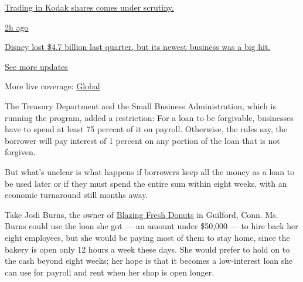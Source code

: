 \href{https://www.nytimes3xbfgragh.onion/live/2020/08/04/business/stock-market-today-coronavirus?action=click\&pgtype=Article\&state=default\&region=MAIN_CONTENT_1\&context=storylines_live_updates\#trading-in-kodak-shares-comes-under-scrutiny}{Trading
in Kodak shares comes under scrutiny.}

\href{https://www.nytimes3xbfgragh.onion/live/2020/08/04/business/stock-market-today-coronavirus?action=click\&pgtype=Article\&state=default\&region=MAIN_CONTENT_1\&context=storylines_live_updates\#disney-lost-4-7-billion-last-quarter-but-its-newest-business-was-a-big-hit}{2h
ago}

\href{https://www.nytimes3xbfgragh.onion/live/2020/08/04/business/stock-market-today-coronavirus?action=click\&pgtype=Article\&state=default\&region=MAIN_CONTENT_1\&context=storylines_live_updates\#disney-lost-4-7-billion-last-quarter-but-its-newest-business-was-a-big-hit}{Disney
lost \$4.7 billion last quarter, but its newest business was a big hit.}

\href{https://www.nytimes3xbfgragh.onion/live/2020/08/04/business/stock-market-today-coronavirus?action=click\&pgtype=Article\&state=default\&region=MAIN_CONTENT_1\&context=storylines_live_updates}{See
more updates}

More live coverage:
\href{https://www.nytimes3xbfgragh.onion/2020/08/04/world/coronavirus-cases.html?action=click\&pgtype=Article\&state=default\&region=MAIN_CONTENT_1\&context=storylines_live_updates}{Global}

The Treasury Department and the Small Business Administration, which is
running the program, added a restriction: For a loan to be forgivable,
businesses have to spend at least 75 percent of it on payroll.
Otherwise, the rules say, the borrower will pay interest of 1 percent on
any portion of the loan that is not forgiven.

But what's unclear is what happens if borrowers keep all the money as a
loan to be used later or if they must spend the entire sum within eight
weeks, with an economic turnaround still months away.

Take Jodi Burns, the owner of
\href{https://www.blazingfreshdonuts.com/}{Blazing Fresh Donuts} in
Guilford, Conn. Ms. Burns could use the loan she got --- an amount under
\$50,000 --- to hire back her eight employees, but she would be paying
most of them to stay home, since the bakery is open only 12 hours a week
these days. She would prefer to hold on to the cash beyond eight weeks;
her hope is that it becomes a low-interest loan she can use for payroll
and rent when her shop is open longer.

